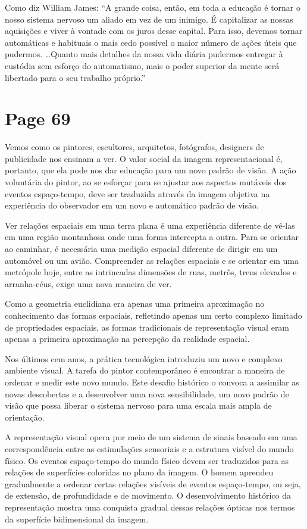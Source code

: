 \documentclass[a4paper]{article}
\begin{document}
Como diz William James:
``A grande coisa, então, em toda a educação é tornar o nosso sistema nervoso um aliado em vez de um inimigo. É capitalizar as nossas aquisições e viver à vontade com os juros desse capital. Para isso, devemos tornar automáticas e habituais o mais cedo possível o maior número de ações úteis que pudermos. \ldots Quanto mais detalhes da nossa vida diária pudermos entregar à custódia sem esforço do automatismo, mais o poder superior da mente será libertado para o seu trabalho próprio.''

\vfill
{}

\newpage
\section*{Page 69}

Vemos como os pintores, escultores, arquitetos, fotógrafos, designers de publicidade nos ensinam a ver. O valor social da imagem representacional é, portanto, que ela pode nos dar educação para um novo padrão de visão. A ação voluntária do pintor, ao se esforçar para se ajustar aos aspectos mutáveis dos eventos espaço-tempo, deve ser traduzida através da imagem objetiva na experiência do observador em um novo e automático padrão de visão.

Ver relações espaciais em uma terra plana é uma experiência diferente de vê-las em uma região montanhosa onde uma forma intercepta a outra. Para se orientar ao caminhar, é necessária uma medição espacial diferente de dirigir em um automóvel ou um avião. Compreender as relações espaciais e se orientar em uma metrópole hoje, entre as intrincadas dimensões de ruas, metrôs, trens elevados e arranha-céus, exige uma nova maneira de ver.

Como a geometria euclidiana era apenas uma primeira aproximação no conhecimento das formas espaciais, refletindo apenas um certo complexo limitado de propriedades espaciais, as formas tradicionais de representação visual eram apenas a primeira aproximação na percepção da realidade espacial.

Nos últimos cem anos, a prática tecnológica introduziu um novo e complexo ambiente visual. A tarefa do pintor contemporâneo é encontrar a maneira de ordenar e medir este novo mundo. Este desafio histórico o convoca a assimilar as novas descobertas e a desenvolver uma nova sensibilidade, um novo padrão de visão que possa liberar o sistema nervoso para uma escala mais ampla de orientação.

A representação visual opera por meio de um sistema de sinais baseado em uma correspondência entre as estimulações sensoriais e a estrutura visível do mundo físico. Os eventos espaço-tempo do mundo físico devem ser traduzidos para as relações de superfícies coloridas no plano da imagem. O homem aprendeu gradualmente a ordenar certas relações visíveis de eventos espaço-tempo, ou seja, de extensão, de profundidade e de movimento. O desenvolvimento histórico da representação mostra uma conquista gradual dessas relações ópticas nos termos da superfície bidimensional da imagem.
\end{document}
